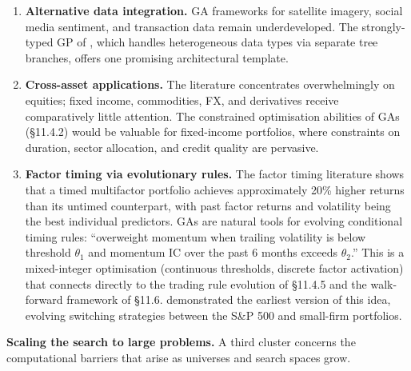 \begin{enumerate}[resume]
\item \textbf{Alternative data integration.} GA frameworks for satellite imagery, social media sentiment, and transaction data remain underdeveloped. The strongly-typed GP of \cite{Christodoulaki2025}, which handles heterogeneous data types via separate tree branches, offers one promising architectural template.
\item \textbf{Cross-asset applications.} The literature concentrates overwhelmingly on equities; fixed income, commodities, FX, and derivatives receive comparatively little attention. The constrained optimisation abilities of GAs (§11.4.2) would be valuable for fixed-income portfolios, where constraints on duration, sector allocation, and credit quality are pervasive.
\item \textbf{Factor timing via evolutionary rules.} The factor timing literature \citep{neuhierl2023timing} shows that a timed multifactor portfolio achieves approximately 20\% higher returns than its untimed counterpart, with past factor returns and volatility being the best individual predictors. GAs are natural tools for evolving conditional timing rules: ``overweight momentum when trailing volatility is below threshold $\theta_1$ and momentum IC over the past 6 months exceeds $\theta_2$.'' This is a mixed-integer optimisation (continuous thresholds, discrete factor activation) that connects directly to the trading rule evolution of §11.4.5 and the walk-forward framework of §11.6. \cite{Bauer1992} demonstrated the earliest version of this idea, evolving switching strategies between the S\&P 500 and small-firm portfolios.
\end{enumerate}

\textbf{Scaling the search to large problems.} A third cluster concerns the computational barriers that arise as universes and search spaces grow.

